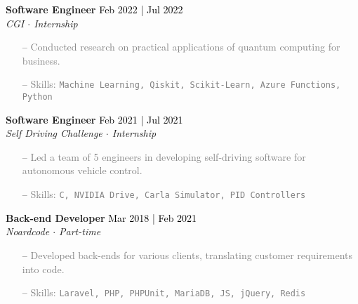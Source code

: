 \documentclass[a4paper]{article}
\begin{document}
\textbf{Software Engineer} \hfill \textcolor{black}{Feb 2022 | Jul 2022}\\
\textit{CGI $\cdot$ Internship}\\
\vspace{-1mm}
\begin{itemize} \itemsep 1pt
    \item[--] \textcolor{gray}{Conducted research on practical applications of quantum computing for business.}
    \item[--] \textcolor{gray}{Skills: \texttt{Machine Learning, Qiskit, Scikit-Learn, Azure Functions, Python}}
\end{itemize}


\textbf{Software Engineer} \hfill \textcolor{black}{Feb 2021 | Jul 2021}\\
\textit{Self Driving Challenge $\cdot$ Internship}\\
\vspace{-1mm}
\begin{itemize} \itemsep 1pt
    \item[--] \textcolor{gray}{Led a team of 5 engineers in developing self-driving software for autonomous vehicle control.}
	\item[--] \textcolor{gray}{Skills: \texttt{C\scalebox{0.7}{++}, NVIDIA Drive, Carla Simulator, PID Controllers}}
\end{itemize}


\textbf{Back-end Developer} \hfill \textcolor{black}{Mar 2018 | Feb 2021}\\
\textit{Noardcode $\cdot$ Part-time}\\
\vspace{-1mm}
\begin{itemize} \itemsep 1pt
    \item[--] \textcolor{gray}{Developed back-ends for various clients, translating customer requirements into code.}

	\item[--] \textcolor{gray}{Skills: \texttt{Laravel, PHP, PHPUnit, MariaDB, JS, jQuery, Redis}}
\end{itemize}
\end{document}
